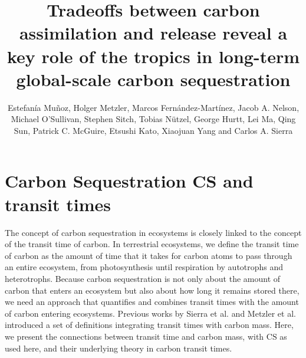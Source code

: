 \documentclass[9pt,twoside,lineno]{pnas-new_SI}
\title{Tradeoffs between carbon assimilation and release reveal a key role of the tropics in long-term global-scale carbon sequestration}
\author{Estefanía Muñoz, Holger Metzler, Marcos Fernández-Martínez, Jacob A. Nelson, Michael O'Sullivan, Stephen Sitch, Tobias Nützel, George Hurtt, Lei Ma, Qing Sun, Patrick C. McGuire, Etsushi Kato, Xiaojuan Yang and Carlos A. Sierra}
\newcommand{\CS}{\mathrm{CS}}
\begin{document}
\renewcommand{\thesection}{S\arabic{section}}


\maketitle




\SItext



\section{Carbon Sequestration CS and transit times}
The concept of carbon sequestration in ecosystems is closely linked to the concept of the transit time of carbon. In terrestrial ecosystems, we define the transit time of carbon as the amount of time that it takes for carbon atoms to pass through an entire ecosystem, from photosynthesis until respiration by autotrophs and heterotrophs. 
Because carbon sequestration is not only about the amount of carbon that enters an ecosystem but also about how long it remains stored there, we need an approach that quantifies and combines transit times with the amount of carbon entering ecosystems. Previous works by Sierra et al. \cite{Sierra2021} and Metzler et al. \cite{Metzler2024} introduced a set of definitions integrating transit times with carbon mass. 
Here, we present the connections between transit time and carbon mass, with $\CS$ as used here, and their underlying theory in carbon transit times.
\end{document}
